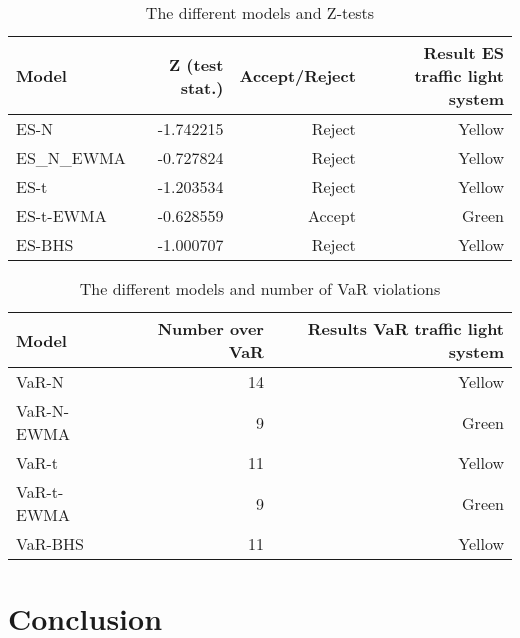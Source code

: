 \documentclass[a4paper]{article}
\begin{document}
\begin{table}[H]
    \centering
    \caption{The different models and Z-tests}
    \vspace{0.2cm}
    \begin{tabular}{lrrr}
        \toprule
                Model &  Z (test stat.) & Accept/Reject & Result ES traffic light system \\
        \midrule
                ES-N &       -1.742215 &        Reject &                         Yellow \\
            ES\_N\_EWMA &       -0.727824 &        Reject &                         Yellow \\
                ES-t &       -1.203534 &        Reject &                         Yellow \\
            ES-t-EWMA &       -0.628559 &        Accept &                          Green \\
            ES-BHS &       -1.000707 &        Reject &                         Yellow \\
        \bottomrule
    \end{tabular} 
\end{table}



\begin{table}[H]
    \centering
    \caption{The different models and number of VaR violations}
    \vspace{0.2cm}
    \begin{tabular}{lrr}
        \toprule
              Model &  Number over VaR & Results VaR traffic light system \\
        \midrule
              VaR-N &               14 &                           Yellow \\
         VaR-N-EWMA &                9 &                            Green \\
              VaR-t &               11 &                           Yellow \\
         VaR-t-EWMA &                9 &                            Green \\
            VaR-BHS &               11 &                           Yellow \\
        \bottomrule
    \end{tabular}    
\end{table}
 
    

\section{Conclusion}
\end{document}
